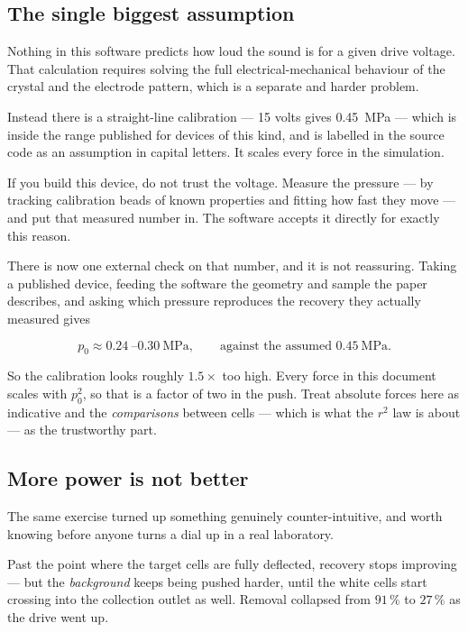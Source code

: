 \documentclass[11pt,a4paper]{article}
\begin{document}
\subsection*{The single biggest assumption}

Nothing in this software predicts how loud the sound is for a given drive
voltage. That calculation requires solving the full electrical-mechanical
behaviour of the crystal and the electrode pattern, which is a separate and
harder problem.

Instead there is a straight-line calibration --- 15 volts gives
\SI{0.45}{\mega\pascal} --- which is inside the range published for devices of
this kind, and is labelled in the source code as an assumption in capital
letters. It scales every force in the simulation.

\begin{plain}
If you build this device, do not trust the voltage. Measure the pressure ---
by tracking calibration beads of known properties and fitting how fast they
move --- and put that measured number in. The software accepts it directly for
exactly this reason.
\end{plain}

There is now one external check on that number, and it is not reassuring. Taking
a published device, feeding the software the geometry and sample the paper
describes, and asking which pressure reproduces the recovery they actually
measured gives

\begin{equation*}
p_0 \approx \SI{0.24}{}\text{--}\SI{0.30}{\mega\pascal},
\qquad\text{against the assumed } \SI{0.45}{\mega\pascal}.
\end{equation*}

So the calibration looks roughly $1.5\times$ too high. Every force in this
document scales with $p_0^2$, so that is a factor of two in the push. Treat
absolute forces here as indicative and the \emph{comparisons} between cells ---
which is what the $r^2$ law is about --- as the trustworthy part.

\subsection*{More power is not better}

The same exercise turned up something genuinely counter-intuitive, and worth
knowing before anyone turns a dial up in a real laboratory.

Past the point where the target cells are fully deflected, recovery stops
improving --- but the \emph{background} keeps being pushed harder, until the
white cells start crossing into the collection outlet as well. Removal collapsed
from $91\,\%$ to $27\,\%$ as the drive went up.
\end{document}
